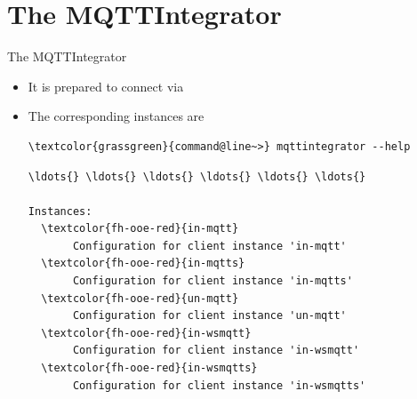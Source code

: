 ﻿\section[nosectionpage]{The MQTTIntegrator}

\begin{frame}[fragile]{The MQTTIntegrator}
\begin{itemize}
\item It is prepared to connect via
\item The corresponding instances are
\begin{scriptsize}
\begin{Verbatim}[commandchars=\\\{\}]
\textcolor{grassgreen}{command@line~>} mqttintegrator --help
\end{Verbatim}
\begin{Verbatim}[commandchars=\\\{\},frame=leftline,rulecolor=\color{fh-ooe-red}]
\ldots{} \ldots{} \ldots{} \ldots{} \ldots{} \ldots{}

Instances:
  \textcolor{fh-ooe-red}{in-mqtt}
       Configuration for client instance 'in-mqtt'
  \textcolor{fh-ooe-red}{in-mqtts}
       Configuration for client instance 'in-mqtts'
  \textcolor{fh-ooe-red}{un-mqtt}
       Configuration for client instance 'un-mqtt'
  \textcolor{fh-ooe-red}{in-wsmqtt}
       Configuration for client instance 'in-wsmqtt'
  \textcolor{fh-ooe-red}{in-wsmqtts}
       Configuration for client instance 'in-wsmqtts'
\end{Verbatim}
\end{scriptsize}
\end{itemize}
\end{frame}
